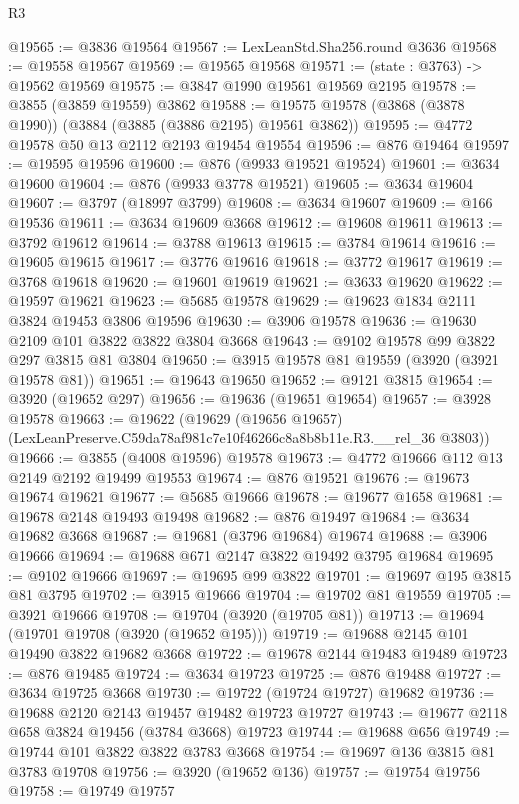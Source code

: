 \begin{lexlean}{R3}
\begin{coremodule}
@19565 := @3836 @19564
@19567 := LexLeanStd.Sha256.round @3636
@19568 := @19558 @19567
@19569 := @19565 @19568
@19571 := (state : @3763) -> @19562 @19569
@19575 := @3847 @1990 @19561 @19569 @2195
@19578 := @3855 (@3859 @19559) @3862
@19588 := @19575 @19578 (@3868 (@3878 @1990)) (@3884 (@3885 (@3886 @2195) @19561 @3862))
@19595 := @4772 @19578 @50 @13 @2112 @2193 @19454 @19554
@19596 := @876 @19464
@19597 := @19595 @19596
@19600 := @876 (@9933 @19521 @19524)
@19601 := @3634 @19600
@19604 := @876 (@9933 @3778 @19521)
@19605 := @3634 @19604
@19607 := @3797 (@18997 @3799)
@19608 := @3634 @19607
@19609 := @166 @19536
@19611 := @3634 @19609 @3668
@19612 := @19608 @19611
@19613 := @3792 @19612
@19614 := @3788 @19613
@19615 := @3784 @19614
@19616 := @19605 @19615
@19617 := @3776 @19616
@19618 := @3772 @19617
@19619 := @3768 @19618
@19620 := @19601 @19619
@19621 := @3633 @19620
@19622 := @19597 @19621
@19623 := @5685 @19578
@19629 := @19623 @1834 @2111 @3824 @19453 @3806 @19596
@19630 := @3906 @19578
@19636 := @19630 @2109 @101 @3822 @3822 @3804 @3668
@19643 := @9102 @19578 @99 @3822 @297 @3815 @81 @3804
@19650 := @3915 @19578 @81 @19559 (@3920 (@3921 @19578 @81))
@19651 := @19643 @19650
@19652 := @9121 @3815
@19654 := @3920 (@19652 @297)
@19656 := @19636 (@19651 @19654)
@19657 := @3928 @19578
@19663 := @19622
    (@19629 (@19656 @19657) (LexLeanPreserve.C59da78af981c7e10f46266c8a8b8b11e.R3.__rel_36 @3803))
@19666 := @3855 (@4008 @19596) @19578
@19673 := @4772 @19666 @112 @13 @2149 @2192 @19499 @19553
@19674 := @876 @19521
@19676 := @19673 @19674 @19621
@19677 := @5685 @19666
@19678 := @19677 @1658
@19681 := @19678 @2148 @19493 @19498
@19682 := @876 @19497
@19684 := @3634 @19682 @3668
@19687 := @19681 (@3796 @19684) @19674
@19688 := @3906 @19666
@19694 := @19688 @671 @2147 @3822 @19492 @3795 @19684
@19695 := @9102 @19666
@19697 := @19695 @99 @3822
@19701 := @19697 @195 @3815 @81 @3795
@19702 := @3915 @19666
@19704 := @19702 @81 @19559
@19705 := @3921 @19666
@19708 := @19704 (@3920 (@19705 @81))
@19713 := @19694 (@19701 @19708 (@3920 (@19652 @195)))
@19719 := @19688 @2145 @101 @19490 @3822 @19682 @3668
@19722 := @19678 @2144 @19483 @19489
@19723 := @876 @19485
@19724 := @3634 @19723
@19725 := @876 @19488
@19727 := @3634 @19725 @3668
@19730 := @19722 (@19724 @19727) @19682
@19736 := @19688 @2120 @2143 @19457 @19482 @19723 @19727
@19743 := @19677 @2118 @658 @3824 @19456 (@3784 @3668) @19723
@19744 := @19688 @656
@19749 := @19744 @101 @3822 @3822 @3783 @3668
@19754 := @19697 @136 @3815 @81 @3783 @19708
@19756 := @3920 (@19652 @136)
@19757 := @19754 @19756
@19758 := @19749 @19757

\end{coremodule}
\end{lexlean}
